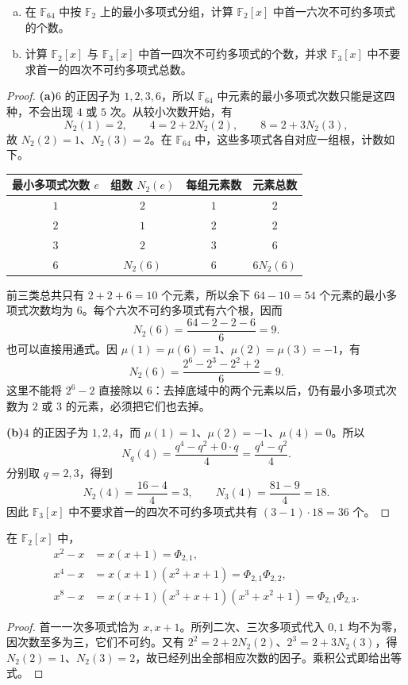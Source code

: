 \documentclass[lang=cn,a4paper,fontset=none,zihao=false,10pt,openany,twoside]{beautybook}
\numberwithin{algorithm}{chapter}
\begin{document}
\begin{example}[按最小多项式分组与计算个数]
\begin{enumerate}[(a)]
\item 在 $\mathbb F_{64}$ 中按 $\mathbb F_2$ 上的最小多项式分组，计算 $\mathbb F_2[x]$ 中首一六次不可约多项式的个数。
\item 计算 $\mathbb F_2[x]$ 与 $\mathbb F_3[x]$ 中首一四次不可约多项式的个数，并求 $\mathbb F_3[x]$ 中不要求首一的四次不可约多项式总数。
\end{enumerate}
\end{example}
\begin{proof}
\par\smallskip\noindent\textbf{(a)}\quad $6$ 的正因子为 $1,2,3,6$，所以 $\mathbb F_{64}$ 中元素的最小多项式次数只能是这四种，不会出现 $4$ 或 $5$ 次。从较小次数开始，有
\[
 N_2(1)=2,\qquad
 4=2+2N_2(2),\qquad
 8=2+3N_2(3),
\]
故 $N_2(2)=1$、$N_2(3)=2$。在 $\mathbb F_{64}$ 中，这些多项式各自对应一组根，计数如下。
\begin{center}
\begin{tabular}{cccc}
\toprule
最小多项式次数 $e$ & 组数 $N_2(e)$ & 每组元素数 & 元素总数\\
\midrule
$1$ & $2$ & $1$ & $2$\\
$2$ & $1$ & $2$ & $2$\\
$3$ & $2$ & $3$ & $6$\\
$6$ & $N_2(6)$ & $6$ & $6N_2(6)$\\
\bottomrule
\end{tabular}
\end{center}
前三类总共只有 $2+2+6=10$ 个元素，所以余下 $64-10=54$ 个元素的最小多项式次数均为 $6$。每个六次不可约多项式有六个根，因而
\[
 N_2(6)=\frac{64-2-2-6}{6}=9.
\]
也可以直接用通式。因 $\mu(1)=\mu(6)=1$、$\mu(2)=\mu(3)=-1$，有
\[
 N_2(6)=\frac{2^6-2^3-2^2+2}{6}=9.
\]
这里不能将 $2^6-2$ 直接除以 $6$：去掉底域中的两个元素以后，仍有最小多项式次数为 $2$ 或 $3$ 的元素，必须把它们也去掉。

\par\smallskip\noindent\textbf{(b)}\quad $4$ 的正因子为 $1,2,4$，而 $\mu(1)=1$、$\mu(2)=-1$、$\mu(4)=0$。所以
\[
 N_q(4)=\frac{q^4-q^2+0\cdot q}{4}
       =\frac{q^4-q^2}{4}.
\]
分别取 $q=2,3$，得到
\[
 N_2(4)=\frac{16-4}{4}=3,\qquad
 N_3(4)=\frac{81-9}{4}=18.
\]
因此 $\mathbb F_3[x]$ 中不要求首一的四次不可约多项式共有 $(3-1)\cdot18=36$ 个。
\end{proof}

\begin{example}[乘积公式的低次情形]
在 $\mathbb F_2[x]$ 中，
\[
 \begin{aligned}
 x^2-x&=x(x+1)=\Phi_{2,1},\\
 x^4-x&=x(x+1)(x^2+x+1)=\Phi_{2,1}\Phi_{2,2},\\
 x^8-x&=x(x+1)(x^3+x+1)(x^3+x^2+1)
       =\Phi_{2,1}\Phi_{2,3}.
 \end{aligned}
\]
\end{example}
\begin{proof}
首一一次多项式恰为 $x,x+1$。所列二次、三次多项式代入 $0,1$ 均不为零，因次数至多为三，它们不可约。又有 $2^2=2+2N_2(2)$、$2^3=2+3N_2(3)$，得 $N_2(2)=1$、$N_2(3)=2$，故已经列出全部相应次数的因子。乘积公式即给出等式。
\end{proof}
\end{document}
